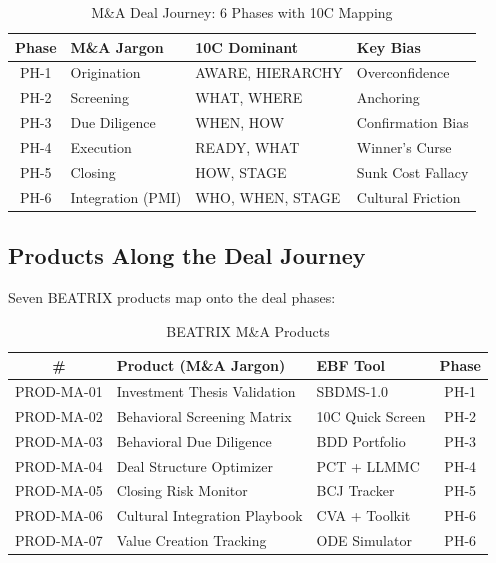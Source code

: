 \begin{table}[htbp]
\centering
\caption{M\&A Deal Journey: 6 Phases with 10C Mapping}
\label{tab:ma-phases}
\begin{tabular}{clll}
\toprule
\textbf{Phase} & \textbf{M\&A Jargon} & \textbf{10C Dominant} & \textbf{Key Bias} \\
\midrule
PH-1 & Origination       & AWARE, HIERARCHY & Overconfidence \\
PH-2 & Screening         & WHAT, WHERE      & Anchoring \\
PH-3 & Due Diligence     & WHEN, HOW        & Confirmation Bias \\
PH-4 & Execution         & READY, WHAT      & Winner's Curse \\
PH-5 & Closing           & HOW, STAGE       & Sunk Cost Fallacy \\
PH-6 & Integration (PMI) & WHO, WHEN, STAGE & Cultural Friction \\
\bottomrule
\end{tabular}
\end{table}


\subsection{Products Along the Deal Journey}

Seven BEATRIX products map onto the deal phases:

\begin{table}[htbp]
\centering
\caption{BEATRIX M\&A Products}
\label{tab:ma-products}
\begin{tabular}{cllc}
\toprule
\textbf{\#} & \textbf{Product (M\&A Jargon)} & \textbf{EBF Tool} & \textbf{Phase} \\
\midrule
PROD-MA-01 & Investment Thesis Validation  & SBDMS-1.0        & PH-1 \\
PROD-MA-02 & Behavioral Screening Matrix   & 10C Quick Screen & PH-2 \\
PROD-MA-03 & Behavioral Due Diligence      & BDD Portfolio    & PH-3 \\
PROD-MA-04 & Deal Structure Optimizer      & PCT + LLMMC      & PH-4 \\
PROD-MA-05 & Closing Risk Monitor          & BCJ Tracker      & PH-5 \\
PROD-MA-06 & Cultural Integration Playbook & CVA + Toolkit    & PH-6 \\
PROD-MA-07 & Value Creation Tracking       & ODE Simulator    & PH-6 \\
\bottomrule
\end{tabular}
\end{table}


